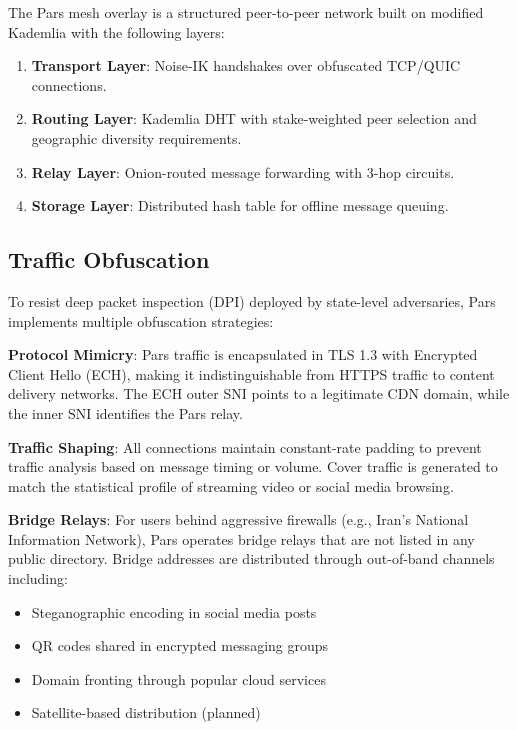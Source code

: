 \documentclass[11pt,a4paper,twocolumn]{article}
\begin{document}
The Pars mesh overlay is a structured peer-to-peer network built on modified Kademlia with the following layers:

\begin{enumerate}[leftmargin=*]
  \item \textbf{Transport Layer}: Noise-IK handshakes over obfuscated TCP/QUIC connections.
  \item \textbf{Routing Layer}: Kademlia DHT with stake-weighted peer selection and geographic diversity requirements.
  \item \textbf{Relay Layer}: Onion-routed message forwarding with 3-hop circuits.
  \item \textbf{Storage Layer}: Distributed hash table for offline message queuing.
\end{enumerate}

\subsection{Traffic Obfuscation}

To resist deep packet inspection (DPI) deployed by state-level adversaries, Pars implements multiple obfuscation strategies:

\textbf{Protocol Mimicry}: Pars traffic is encapsulated in TLS 1.3 with Encrypted Client Hello (ECH), making it indistinguishable from HTTPS traffic to content delivery networks. The ECH outer SNI points to a legitimate CDN domain, while the inner SNI identifies the Pars relay.

\textbf{Traffic Shaping}: All connections maintain constant-rate padding to prevent traffic analysis based on message timing or volume. Cover traffic is generated to match the statistical profile of streaming video or social media browsing.

\textbf{Bridge Relays}: For users behind aggressive firewalls (e.g., Iran's National Information Network), Pars operates bridge relays that are not listed in any public directory. Bridge addresses are distributed through out-of-band channels including:
\begin{itemize}
  \item Steganographic encoding in social media posts
  \item QR codes shared in encrypted messaging groups
  \item Domain fronting through popular cloud services
  \item Satellite-based distribution (planned)
\end{itemize}
\end{document}
